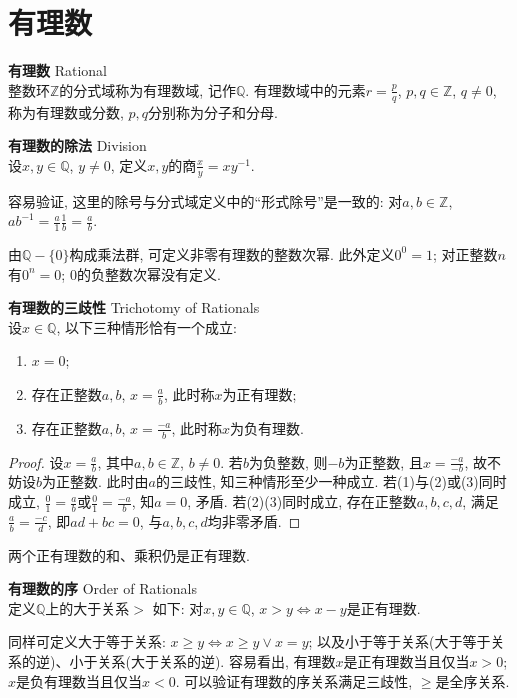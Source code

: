 \section{有理数}

\begin{dfn}\textbf{有理数} Rational\\
整数环$\mathbb{Z}$的分式域称为有理数域, 记作$\mathbb{Q}$. 有理数域中的元素$r=\frac{p}{q}$, $p,q\in \mathbb{Z}$, $q\neq 0$, 称为有理数或分数, $p,q$分别称为分子和分母.  
\end{dfn}

\begin{dfn}\textbf{有理数的除法} Division\\
设$x,y\in \mathbb{Q}$, $y\neq 0$, 定义$x,y$的商$\frac{x}{y}=xy^{-1}$. 
\end{dfn}

\par 容易验证, 这里的除号与分式域定义中的“形式除号”是一致的: 对$a,b\in \mathbb{Z}$, $ab^{-1}=\frac{a}{1} \frac{1}{b}=\frac{a}{b}$.

\par 由$\mathbb{Q}-\{0\}$构成乘法群, 可定义非零有理数的整数次幂. 此外定义$0^0=1$; 对正整数$n$有$0^n=0$; 0的负整数次幂没有定义. 

\begin{pro}\textbf{有理数的三歧性} Trichotomy of Rationals\\
设$x\in \mathbb{Q}$, 以下三种情形恰有一个成立:
\begin{enumerate}
    \item $x=0$;
    \item 存在正整数$a,b$, $x=\frac{a}{b}$, 此时称$x$为正有理数;
    \item 存在正整数$a,b$, $x=\frac{-a}{b}$, 此时称$x$为负有理数.
\end{enumerate}
\end{pro}
\begin{proof}
设$x=\frac{a}{b}$, 其中$a,b\in\mathbb{Z}$, $b\neq 0$. 若$b$为负整数, 则$-b$为正整数, 且$x=\frac{-a}{-b}$, 故不妨设$b$为正整数. 此时由$a$的三歧性, 知三种情形至少一种成立. 若(1)与(2)或(3)同时成立, $\frac{0}{1}=\frac{a}{b}$或$\frac{0}{1}=\frac{-a}{b}$, 知$a=0$, 矛盾. 若(2)(3)同时成立, 存在正整数$a,b,c,d$, 满足$\frac{a}{b}=\frac{-c}{d}$, 即$ad+bc=0$, 与$a,b,c,d$均非零矛盾. 
\end{proof}
\par 两个正有理数的和、乘积仍是正有理数. 

\begin{dfn}\textbf{有理数的序} Order of Rationals\\
定义$\mathbb{Q}$上的大于关系$>$ 如下: 对$x,y \in \mathbb{Q}$, $x>y \iff x-y$是正有理数. 
\end{dfn}
\par 同样可定义大于等于关系: $x\ge y \iff x\ge y \lor x=y$; 以及小于等于关系(大于等于关系的逆)、小于关系(大于关系的逆). 容易看出, 有理数$x$是正有理数当且仅当$x>0$; $x$是负有理数当且仅当$x<0$. 可以验证有理数的序关系满足三歧性, $\ge$是全序关系. 

